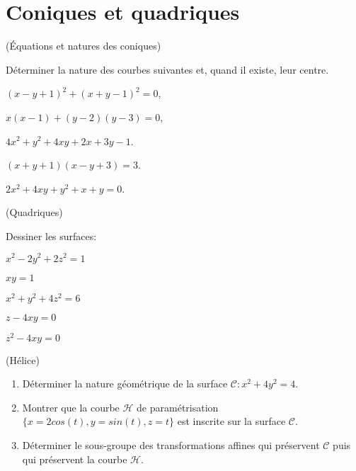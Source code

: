 \documentclass[a4paper,12pt,reqno]{amsart}
\begin{document}
\section{Coniques et quadriques}


\begin{exo} (Équations et natures des coniques)

  Déterminer la nature des courbes suivantes et, quand il existe, leur centre.
  \begin{examplescol}{2}
    \item $(x-y+1)^2+(x+y-1)^2=0$,
    \item $x(x-1)+(y-2)(y-3)=0$,
    \item $4x^{2}+y^{2}+4xy+2x+3y-1$.
    \item $(x+y+1)(x-y+3)=3$.
    \item $2x^{2}+4xy+y^{2}+x+y=0$.
  \end{examplescol}

\end{exo}


\begin{exo} (Quadriques)

  Dessiner les surfaces:
  \begin{examplescol}{2}
    \item $x^2-2y^2+2z^2=1$
    \item $xy=1$
    \item $x^2+y^2+4z^2=6$
    \item $z-4xy=0$
    \item $z^2-4xy=0$
  \end{examplescol}

\end{exo}


\begin{exo} (Hélice)

  \begin{enumerate}
    \item Déterminer la nature géométrique de la surface $\mathcal{C}:x^2+4y ^2=4$.
    \item Montrer que la courbe $\mathcal{H}$ de paramétrisation $\{x=2cos(t), y= sin(t), z=t\}$ est inscrite sur la surface $\mathcal{C}$.
    \item Déterminer le sous-groupe des transformations affines qui préservent $\mathcal{C}$ puis qui préservent la courbe $\mathcal{H}$.
  \end{enumerate}

\end{exo}
\end{document}
